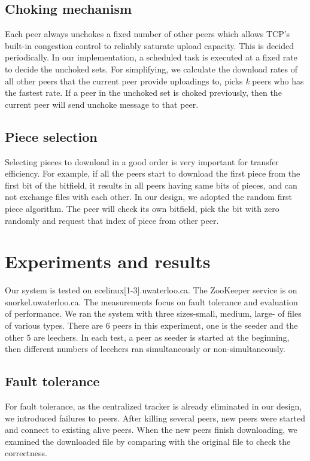 \documentclass[conference]{IEEEtran}
\begin{document}
	\subsection{Choking mechanism}
	Each peer always unchokes a fixed number of other peers which allows TCP's built-in congestion control to reliably saturate upload capacity\cite{BitTorrent}. This is decided periodically. In our implementation, a scheduled task is executed at a fixed rate to decide the unchoked sets. For simplifying, we calculate the download rates of all other peers that the current peer provide uploadings to, picks \emph{k} peers who has the fastest rate. If a peer in the unchoked set is choked previously, then the current peer will send unchoke message to that peer.
	
	\subsection{Piece selection}
	Selecting pieces to download in a good order is very important for transfer efficiency. For example, if all the peers start to download the first piece from the first bit of the bitfield, it results in all peers having same bits of pieces, and can not exchange files with each other. In our design, we adopted the random first piece algorithm. The peer will check its own bitfield, pick the bit with zero randomly and request that index of piece from other peer.
	
	\section{Experiments and results}
Our system is tested on ecelinux[1-3].uwaterloo.ca. The ZooKeeper service is on snorkel.uwaterloo.ca. The measurements focus on fault tolerance and evaluation of performance. We ran the system with three sizes-small, medium, large- of files of various types. There are 6 peers in this experiment, one is the seeder and the other 5 are leechers. In each test, a peer as seeder is started at the beginning, then different numbers of leechers ran simultaneously or non-simultaneously. 
	
	\subsection{Fault tolerance}
	For fault tolerance, as the centralized tracker is already eliminated in our design, we introduced failures to peers. After killing several peers, new peers were started and connect to existing alive  peers. When the new peers finish downloading, we examined the downloaded file by comparing with the original file to check the correctness. 
	
\end{document}
